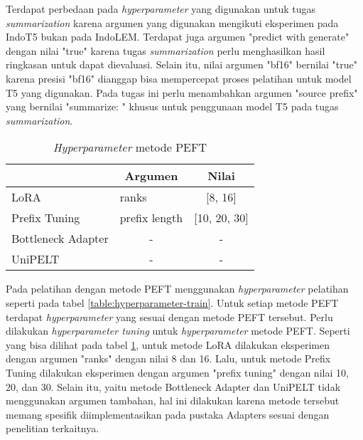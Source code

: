 Terdapat perbedaan pada \textit{hyperparameter} yang digunakan untuk tugas \textit{summarization} karena argumen yang digunakan mengikuti eksperimen pada IndoT5 bukan pada IndoLEM. Terdapat juga argumen "predict with generate" dengan nilai "true" karena tugas \textit{summarization} perlu menghasilkan hasil ringkasan untuk dapat dievaluasi. Selain itu, nilai argumen "bf16" bernilai "true" karena presisi "bf16" dianggap bisa mempercepat proses pelatihan untuk model T5 yang digunakan. Pada tugas ini perlu menambahkan argumen "source prefix" yang bernilai "summarize: " khusus untuk penggunaan model T5 pada tugas \textit{summarization}.

\begin{table}[h]
    \centering
    \caption{\textit{Hyperparameter} metode PEFT}
    \label{table:hyperparameter-PEFT}
    \begin{tabular}{|l|l|c|}
        \hline \rowcolor{black!10}
        \multicolumn{1}{|c|}{\textbf{Metode}} & \multicolumn{1}{|c|}{\textbf{Argumen}} & \textbf{Nilai} \\ \hline
        LoRA & ranks & [8, 16] \\ \hline
        Prefix Tuning & prefix length & [10, 20, 30] \\ \hline
        Bottleneck Adapter & \multicolumn{1}{|c|}{-} & - \\ \hline
        UniPELT & \multicolumn{1}{|c|}{-}  & - \\ \hline
    \end{tabular}
\end{table}

Pada pelatihan dengan metode PEFT  menggunakan \textit{hyperparameter} pelatihan seperti pada tabel \ref{table:hyperparameter-train}. Untuk setiap metode PEFT terdapat \textit{hyperparameter} yang sesuai dengan metode PEFT tersebut. Perlu dilakukan \textit{hyperparameter tuning} untuk \textit{hyperparameter} metode PEFT. Seperti yang bisa dilihat pada tabel \ref{table:hyperparameter-PEFT}, untuk metode LoRA dilakukan eksperimen dengan argumen "ranks" dengan nilai 8 dan 16. Lalu, untuk metode Prefix Tuning dilakukan eksperimen dengan argumen "prefix tuning" dengan nilai 10, 20, dan 30. Selain itu, yaitu metode Bottleneck Adapter dan UniPELT tidak menggunakan argumen tambahan, hal ini dilakukan karena metode tersebut memang spesifik diimplementasikan pada pustaka Adapters sesuai dengan penelitian terkaitnya.
